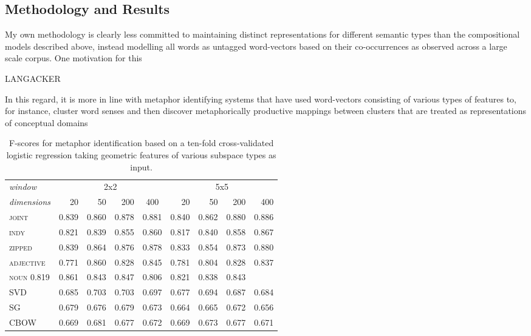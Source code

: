 
\subsection{Methodology and Results}
My own methodology is clearly less committed to maintaining distinct representations for different semantic types than the compositional models described above, instead modelling all words as untagged word-vectors based on their co-occurrences as observed across a large scale corpus.  One motivation for this 

LANGACKER

In this regard, it is more in line with metaphor identifying systems that have used word-vectors consisting of various types of features to, for instance, cluster word senses and then discover metaphorically productive mappings between clusters that are treated as representations of conceptual domains

\begin{table}
\centering
\begin{tabular}{lrrrr|rrrr}
\hline
\emph{window} & \multicolumn{4}{c}{2x2} & \multicolumn{4}{c}{5x5} \\
\emph{dimensions} & 20 & 50 & 200 & \multicolumn{1}{c}{400} & 20 & 50 & 200 & 400 \\
\hline
\textsc{joint} & 0.839 & 0.860 & 0.878 & 0.881 & 0.840 & 0.862 & 0.880 & 0.886 \\
\textsc{indy} & 0.821 & 0.839 & 0.855 & 0.860 & 0.817 & 0.840 & 0.858 & 0.867 \\
\textsc{zipped} & 0.839 & 0.864 & 0.876 & 0.878 & 0.833 & 0.854 & 0.873 & 0.880 \\
\textsc{adjective} & 0.771 & 0.860 & 0.828 & 0.845 & 0.781 & 0.804 & 0.828 & 0.837 \\
\textsc{noun} 0.819 & 0.861 & 0.843 & 0.847 & 0.806 & 0.821 & 0.838 & 0.843 \\
\textsc{SVD} & 0.685 & 0.703 & 0.703 & 0.697 & 0.677 & 0.694 & 0.687 & 0.684 \\
\textsc{SG} & 0.679 & 0.676 & 0.679 & 0.673 & 0.664 & 0.665 & 0.672 & 0.656 \\
\textsc{CBOW} & 0.669 & 0.681 & 0.677 & 0.672 & 0.669 & 0.673 & 0.677 & 0.671 \\
\hline
\end{tabular}
\caption{F-scores for metaphor identification based on a ten-fold cross-validated logistic regression taking geometric features of various subspace types as input.}
\label{tab:related}
\end{table}

